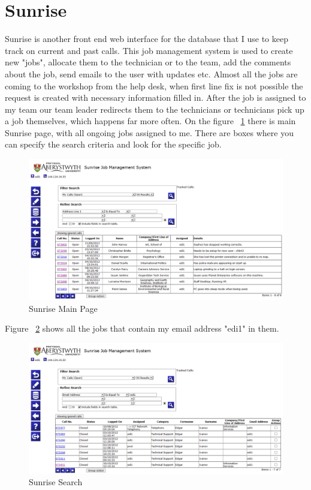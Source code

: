 \documentclass[10pt,a4paper,headinclude=true,twoside]{report}
\begin{document}
\section{Sunrise}
Sunrise is another front end web interface for the database that I use to keep track on current and past calls. This job management system is used to create new "jobs", allocate them to the technician or to the team, add the comments about the job, send emails to the user with updates etc. Almost all the jobs are coming to the workshop from the help desk, when first line fix is not possible the request is created with necessary information filled in. After the job is assigned to my team our team leader redirects them to the technicians or technicians pick up a job themselves, which happens far more often. On the figure ~\ref{fig:sunrise_main} there is main Sunrise page, with all ongoing jobs assigned to me. There are boxes where you can specify the search criteria and look for the specific job.

\begin{figure}[H]
\centering
\centerline{\includegraphics[scale=0.5]{./sunrise_main}}
\caption{Sunrise Main Page}
\label{fig:sunrise_main}
\end{figure}

Figure ~\ref{fig:sunrise_search} shows all the jobs that contain my email address "edi1" in them.

\begin{figure}[H]
\centering
\centerline{\includegraphics[scale=0.4]{./sunrise_search}}
\caption{Sunrise Search}
\label{fig:sunrise_search}
\end{figure}
\end{document}
